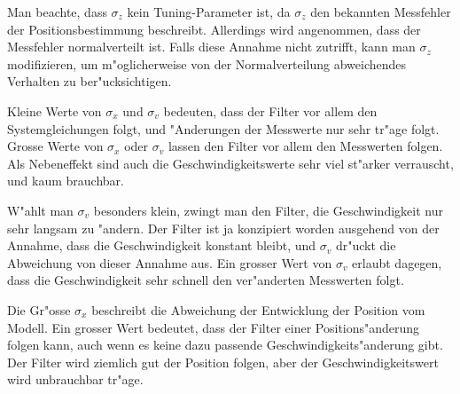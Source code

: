 Man beachte, dass $\sigma_z$ kein Tuning-Parameter ist, da $\sigma_z$
den bekannten Messfehler der Positionsbestimmung beschreibt.
Allerdings wird angenommen, dass der Messfehler normalverteilt ist.
Falls diese Annahme nicht zutrifft, kann man $\sigma_z$ modifizieren,
um m"oglicherweise von der Normalverteilung abweichendes Verhalten
zu ber"ucksichtigen.

Kleine Werte von $\sigma_x$ und $\sigma_v$ bedeuten, dass der Filter
vor allem den Systemgleichungen folgt, und "Anderungen der
Messwerte nur sehr tr"age folgt.
Grosse Werte von $\sigma_x$ oder $\sigma_v$ lassen den Filter vor allem
den Messwerten folgen. 
Als Nebeneffekt sind auch die Geschwindigkeitswerte sehr viel st"arker
verrauscht, und kaum brauchbar.

W"ahlt man $\sigma_v$ besonders klein, zwingt man den Filter, die
Geschwindigkeit nur sehr langsam zu "andern.
Der Filter ist ja konzipiert worden ausgehend von der Annahme,
dass die Geschwindigkeit konstant bleibt, und $\sigma_v$ dr"uckt
die Abweichung von dieser Annahme aus.
Ein grosser Wert von $\sigma_v$ erlaubt dagegen, dass die Geschwindigkeit
sehr schnell den ver"anderten Messwerten folgt.

Die Gr"osse $\sigma_x$ beschreibt die Abweichung der Entwicklung
der Position vom Modell.
Ein grosser Wert bedeutet, dass der Filter einer Positions"anderung
folgen kann, auch wenn es keine dazu passende Geschwindigkeits"anderung
gibt.
Der Filter wird ziemlich gut der Position folgen, aber der
Geschwindigkeitswert wird unbrauchbar tr"age.

